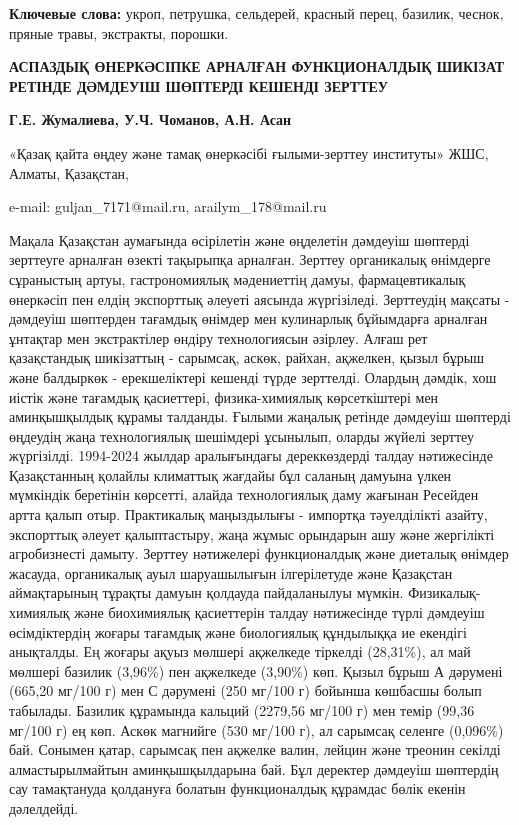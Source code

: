 {\bfseries Ключевые слова:} укроп, петрушка, сельдерей, красный перец,
базилик, чеснок, пряные травы, экстракты, порошки.

\begin{articleheader}
{\bfseries АСПАЗДЫҚ ӨНЕРКӘСІПКЕ АРНАЛҒАН ФУНКЦИОНАЛДЫҚ ШИКІЗАТ РЕТІНДЕ
ДӘМДЕУІШ ШӨПТЕРДІ КЕШЕНДІ ЗЕРТТЕУ}

{\bfseries
Г.Е. Жумалиева\textsuperscript{\envelope },
У.Ч. Чоманов,
А.Н. Асан\textsuperscript{\envelope }
}
\end{articleheader}

\begin{affiliation}
«Қазақ қайта өңдеу және тамақ өнеркәсібі ғылыми-зерттеу институты» ЖШС,
Алматы, Қазақстан,

e-mail: guljan\_7171@mail.ru, arailym\_178@mail.ru
\end{affiliation}

Мақала Қазақстан аумағында өсірілетін және өңделетін дәмдеуіш шөптерді
зерттеуге арналған өзекті тақырыпқа арналған. Зерттеу органикалық
өнімдерге сұраныстың артуы, гастрономиялық мәдениеттің дамуы,
фармацевтикалық өнеркәсіп пен елдің экспорттық әлеуеті аясында
жүргізіледі. Зерттеудің мақсаты - дәмдеуіш шөптерден тағамдық өнімдер
мен кулинарлық бұйымдарға арналған ұнтақтар мен экстрактілер өндіру
технологиясын әзірлеу. Алғаш рет қазақстандық шикізаттың - сарымсақ,
аскөк, райхан, ақжелкен, қызыл бұрыш және балдыркөк - ерекшеліктері
кешенді түрде зерттелді. Олардың дәмдік, хош иістік және тағамдық
қасиеттері, физика-химиялық көрсеткіштері мен аминқышқылдық құрамы
талданды. Ғылыми жаңалық ретінде дәмдеуіш шөптерді өңдеудің жаңа
технологиялық шешімдері ұсынылып, оларды жүйелі зерттеу жүргізілді.
1994-2024 жылдар аралығындағы дереккөздерді талдау нәтижесінде
Қазақстанның қолайлы климаттық жағдайы бұл саланың дамуына үлкен
мүмкіндік беретінін көрсетті, алайда технологиялық даму жағынан Ресейден
артта қалып отыр. Практикалық маңыздылығы - импортқа тәуелділікті
азайту, экспорттық әлеует қалыптастыру, жаңа жұмыс орындарын ашу және
жергілікті агробизнесті дамыту. Зерттеу нәтижелері функционалдық және
диеталық өнімдер жасауда, органикалық ауыл шаруашылығын ілгерілетуде
және Қазақстан аймақтарының тұрақты дамуын қолдауда пайдаланылуы мүмкін.
Физикалық-химиялық және биохимиялық қасиеттерін талдау нәтижесінде түрлі
дәмдеуіш өсімдіктердің жоғары тағамдық және биологиялық құндылыққа ие
екендігі анықталды. Ең жоғары ақуыз мөлшері ақжелкеде тіркелді
(28,31\%), ал май мөлшері базилик (3,96\%) пен ақжелкеде (3,90\%) көп.
Қызыл бұрыш А дәрумені (665,20 мг/100 г) мен С дәрумені (250 мг/100 г)
бойынша көшбасшы болып табылады. Базилик құрамында кальций (2279,56
мг/100 г) мен темір (99,36 мг/100 г) ең көп. Аскөк магнийге (530 мг/100
г), ал сарымсақ селенге (0,096\%) бай. Сонымен қатар, сарымсақ пен
ақжелке валин, лейцин және треонин секілді алмастырылмайтын
аминқышқылдарына бай. Бұл деректер дәмдеуіш шөптердің сау тамақтануда
қолдануға болатын функционалдық құрамдас бөлік екенін дәлелдейді.

